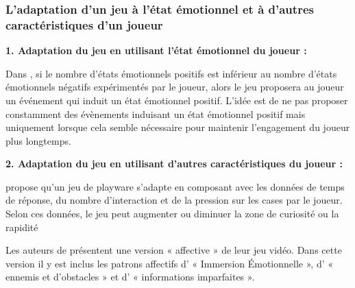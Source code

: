 \documentclass[11pt]{article}
\begin{document}
		\subsubsection{L'adaptation d'un jeu à l'état émotionnel et à d'autres caractéristiques d'un joueur} \label{sect:adaptation}
			\textbf{1. Adaptation du jeu en utilisant l'état émotionnel du joueur :}\par
            Dans \cite{Mostefai_et_al._2019}, si le nombre d’états émotionnels positifs est inférieur au nombre d’états émotionnels négatifs expérimentés par le joueur, alors le jeu proposera au joueur un événement qui induit un état émotionnel positif. 
            L’idée est de ne pas proposer constamment des évènements induisant un état émotionnel positif mais uniquement lorsque cela semble nécessaire pour maintenir l’engagement du joueur plus longtemps.
        	\vspace*{0.6cm}\par
        	\textbf{2. Adaptation du jeu en utilisant d'autres caractéristiques du joueur :}\par
        	\cite{yannakakis_et_al._2009} propose qu’un jeu de playware s’adapte en composant avec les données de temps de réponse, du nombre d’interaction et de la pression sur les cases par le joueur. Selon ces données, le jeu peut augmenter ou diminuer la zone de curiosité ou la rapidité\par
            Les auteurs de \cite{nalepa_et_al._2017} présentent une version « affective » de leur jeu vidéo. Dans cette version il y est inclus les patrons affectifs d’ « Immersion Émotionnelle », d’ « ennemis et d’obstacles » et d’ « informations imparfaites ».
\end{document}
